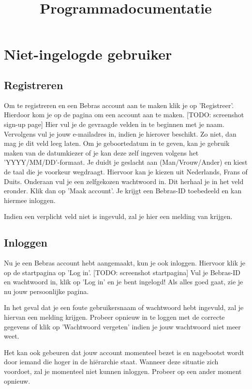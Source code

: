 \documentclass[]{article}
\title{
    Programmadocumentatie
}
\begin{document}
\maketitle

\section{Niet-ingelogde gebruiker}

\subsection{Registreren}
Om te registreren en een Bebras account aan te maken klik je op 'Registreer'. Hierdoor kom je op de pagina om een account aan te maken. [TODO: screenshot sign-up page] Hier vul je de gevraagde velden in te beginnen met je naam. Vervolgens vul je jouw e-mailadres in, indien je hierover beschikt. Zo niet, dan mag je dit veld leeg laten. Om je geboortedatum in te geven, kan je gebruik maken van de datumkiezer of je kan deze zelf ingeven volgens het 'YYYY/MM/DD'-formaat. Je duidt je geslacht aan (Man/Vrouw/Ander) en kiest de taal die je voorkeur wegdraagt. Hiervoor kan je kiezen uit Nederlands, Frans of Duits. Onderaan vul je een zelfgekozen wachtwoord in. Dit herhaal je in het veld eronder. Klik dan op 'Maak account'. Je krijgt een Bebras-ID toebedeeld en kan hiermee inloggen.

Indien een verplicht veld niet is ingevuld, zal je hier een melding van krijgen. 

\subsection{Inloggen}
Nu je een Bebras account hebt aangemaakt, kun je ook inloggen. Hiervoor klik je op de startpagina op 'Log in'. [TODO: screenshot startpagina] Vul je Bebras-ID en wachtwoord in, klik op 'Log in' en je bent ingelogd! Als alles goed gaat, zie je nu jouw persoonlijke pagina. 

In het geval dat je een foute gebruikersnaam of wachtwoord hebt ingevuld, zal je hiervan een melding krijgen. Probeer opnieuw in te loggen met de correcte gegevens of klik op 'Wachtwoord vergeten' indien je jouw wachtwoord niet meer weet.

Het kan ook gebeuren dat jouw account momenteel bezet is en nagebootst wordt door iemand die hoger in de hiërarchie staat. Wanneer deze situatie zich voordoet, zal je momenteel niet kunnen inloggen. Probeer op een ander moment opnieuw.
\end{document}
